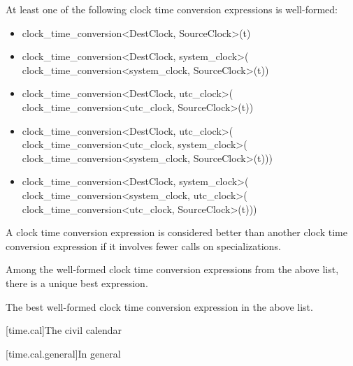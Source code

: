 \begin{itemdescr}
\pnum
\constraints
At least one of the following clock time conversion expressions
is well-formed:

\begin{itemize}
\item
\begin{codeblock}
clock_time_conversion<DestClock, SourceClock>{}(t)
\end{codeblock}

\item
\begin{codeblock}
clock_time_conversion<DestClock, system_clock>{}(
    clock_time_conversion<system_clock, SourceClock>{}(t))
\end{codeblock}

\item
\begin{codeblock}
clock_time_conversion<DestClock, utc_clock>{}(
    clock_time_conversion<utc_clock, SourceClock>{}(t))
\end{codeblock}

\item
\begin{codeblock}
clock_time_conversion<DestClock, utc_clock>{}(
    clock_time_conversion<utc_clock, system_clock>{}(
        clock_time_conversion<system_clock, SourceClock>{}(t)))
\end{codeblock}

\item
\begin{codeblock}
clock_time_conversion<DestClock, system_clock>{}(
    clock_time_conversion<system_clock, utc_clock>{}(
        clock_time_conversion<utc_clock, SourceClock>{}(t)))
\end{codeblock}
\end{itemize}

A clock time conversion expression is considered better than
another clock time conversion expression if it involves fewer
 calls on 
specializations.

\pnum
\mandates
Among the well-formed clock time conversion expressions
from the above list, there is a unique best expression.

\pnum
\returns
The best well-formed clock time conversion expression in the above list.
\end{itemdescr}

[time.cal]{The civil calendar}

[time.cal.general]{In general}

